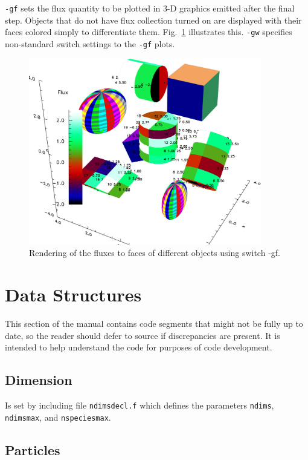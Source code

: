 \documentclass[12pt]{article}
\begin{document}
\verb!-gf!  sets the flux quantity to be plotted in 3-D graphics
emitted after the final step. Objects that do not have flux collection
turned on are displayed with their faces colored simply to
differentiate them. Fig.\ \ref{manyflux} illustrates this. \verb!-gw! specifies non-standard switch settings
to the \verb!-gf! plots.
\begin{figure}[htp]
  \centering
  \includegraphics[width=4in]{manyflux}
  \caption{Rendering of the fluxes to faces of different objects using
    switch -gf.\label{manyflux}}
\end{figure}


\section{Data Structures}

This section of the manual contains code segments that might not be
fully up to date, so the reader should defer to source if
discrepancies are present. It is intended to help understand the code
for purposes of code development.

\subsection{Dimension}

Is set by including file \verb!ndimsdecl.f! which defines the
parameters \verb!ndims!, \verb!ndimsmax!, and \verb!nspeciesmax!.


\subsection{Particles}
\end{document}
